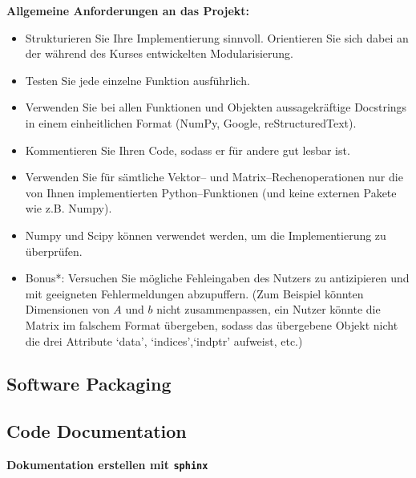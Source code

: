 




\textbf{Allgemeine Anforderungen an das Projekt:}\\

	\begin{itemize}
		\item Strukturieren Sie Ihre Implementierung sinnvoll. Orientieren Sie sich dabei an der während des Kurses entwickelten Modularisierung.
		\item Testen Sie jede einzelne Funktion ausführlich.
		\item Verwenden Sie bei allen Funktionen und Objekten aussagekräftige Docstrings in einem einheitlichen Format (NumPy, Google, reStructuredText).
		\item Kommentieren Sie Ihren Code, sodass er für andere gut lesbar ist.
		\item Verwenden Sie für sämtliche Vektor-- und Matrix--Rechenoperationen nur die von Ihnen implementierten Python--Funktionen (und keine externen Pakete wie z.B. Numpy).
		\item Numpy und Scipy können verwendet werden, um die Implementierung zu überprüfen.
		\item Bonus*: Versuchen Sie mögliche Fehleingaben des Nutzers zu antizipieren und mit geeigneten Fehlermeldungen abzupuffern.	(Zum Beispiel könnten Dimensionen von $A$ und $b$ nicht zusammenpassen, ein Nutzer könnte die Matrix im falschem Format übergeben, sodass das übergebene Objekt nicht die drei Attribute `data', `indices',`indptr' aufweist, etc.)
	\end{itemize}



\subsection{Software Packaging}

\subsection{Code Documentation}


 \textbf{Dokumentation erstellen mit \texttt{sphinx}}\\

